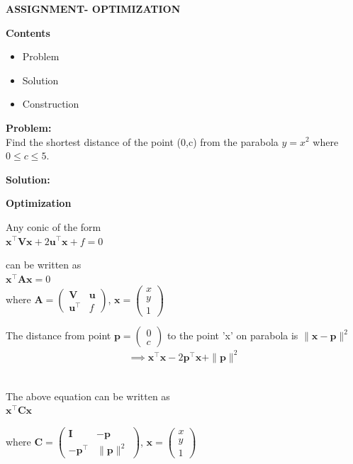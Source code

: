 \documentclass[8pt,a4paper]{report}
\newcommand{\myvec}[1]{\ensuremath{\begin{pmatrix}#1\end{pmatrix}}}
\let\vec\mathbf
\begin{document}
\vspace{15mm}
\centering \Large \textbf{ASSIGNMENT- OPTIMIZATION}
\vspace{15mm}
\begin{multicols}{2}


\raggedright \Large \textbf{Contents} \vspace{2mm}
\begin{itemize}
\raggedright \item Problem \item Solution\item Construction
\end{itemize}\vspace {5mm}
 

\raggedright \Large \textbf{Problem:} \vspace{2mm}
	\\ Find the shortest distance of the point (0,c) from the parabola $y = x^2$ where $0\le c \le 5$.\vspace{4mm}
\\\raggedright\Large \textbf{Solution:} \vspace{2mm}
 \\ \raggedright \textbf{Optimization}
\\ \raggedright Any conic of the form 
	\\ \centering $\vec{x^{\top}}\vec{V}\vec{x} + 2\vec{u^{\top}}\vec{x} + f = 0$ 
\\ \raggedright can be written as
	\\ \centering $\vec{x^{\top}}\vec{A}\vec{x} = 0$ 
	\\ where $\vec{A} = \myvec{\vec{V}&\vec{u}\\\vec{u^{\top}}&f}$, $\vec{x} =\myvec{x\\y\\1}$
	\\ \raggedright The distance from point $\vec{p} = \myvec{0\\c}$ to the point 'x' on parabola is $\|\vec{x}-\vec{p}\|^2$
\begin{gather*}
	\implies \vec{x^{\top}}\vec{x} - 2\vec{p^{\top}}\vec{x} + \|\vec{p}\|^2
\end{gather*}
	\\ \raggedright The above equation can be written as \\\centering $\vec{x^{\top}}\vec{C}\vec{x}$
	\\ \raggedright where $\vec{C} = \myvec{\vec{I}&-\vec{p}\\ -\vec{p^{\top}}& \|\vec{p}\|^2}$, $\vec{x} = \myvec{x\\y\\1}$

\end{multicols}
\end{document}
